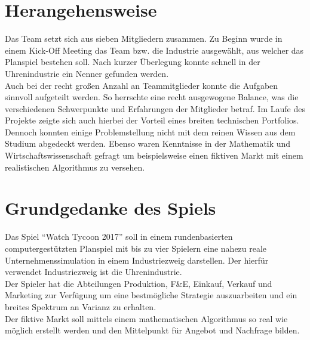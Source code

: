 \section{Herangehensweise}\label{sec:herangehensweise}
Das Team setzt sich aus sieben Mitgliedern zusammen. Zu Beginn wurde in einem Kick-Off Meeting das Team bzw. die Industrie ausgewählt, aus welcher das Planspiel bestehen soll. Nach kurzer Überlegung konnte schnell in der Uhrenindustrie ein Nenner gefunden werden. \\
Auch bei der recht großen Anzahl an Teammitglieder konnte die Aufgaben sinnvoll aufgeteilt werden. So herrschte eine recht ausgewogene Balance, was die verschiedenen Schwerpunkte und Erfahrungen der Mitglieder betraf. Im Laufe des Projekte zeigte sich auch hierbei der Vorteil eines breiten technischen Portfolios. Dennoch konnten einige Problemstellung nicht mit dem reinen Wissen aus dem Studium abgedeckt werden. Ebenso waren Kenntnisse in der Mathematik und Wirtschaftswissenschaft gefragt um beispielsweise einen fiktiven Markt mit einem realistischen Algorithmus zu versehen.      

\section{Grundgedanke des Spiels}
Das Spiel \enquote{Watch Tycoon 2017} soll in einem rundenbasierten computergestützten Planspiel mit bis zu vier Spielern eine nahezu reale Unternehmenssimulation in einem Industriezweig darstellen. Der hierfür verwendet Industriezweig ist die Uhrenindustrie.\\
Der Spieler hat die Abteilungen Produktion, F\&E, Einkauf, Verkauf und Marketing zur Verfügung um eine bestmögliche Strategie auszuarbeiten und ein breites Spektrum an Varianz zu erhalten.\\
Der fiktive Markt soll mittels einem mathematischen Algorithmus so real wie möglich erstellt werden und den Mittelpunkt für Angebot und Nachfrage bilden.













